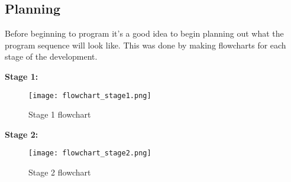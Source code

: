 \documentclass[../report.tex]{subfiles}
\begin{document}
    \subsection{Planning}
    Before beginning to program it's a good idea to begin planning out what the
    program sequence will look like. This was done by making flowcharts for
    each stage of the development.

    
    \textbf{Stage 1:}
    \begin{figure}[H]
        \centering
        \texttt{[image: flowchart\_stage1.png]}
        \caption{Stage 1 flowchart}
    \end{figure}
    \textbf{Stage 2:}
    \begin{figure}[H]
        \centering
        \texttt{[image: flowchart\_stage2.png]}
        \caption{Stage 2 flowchart}
    \end{figure}
\end{document}
